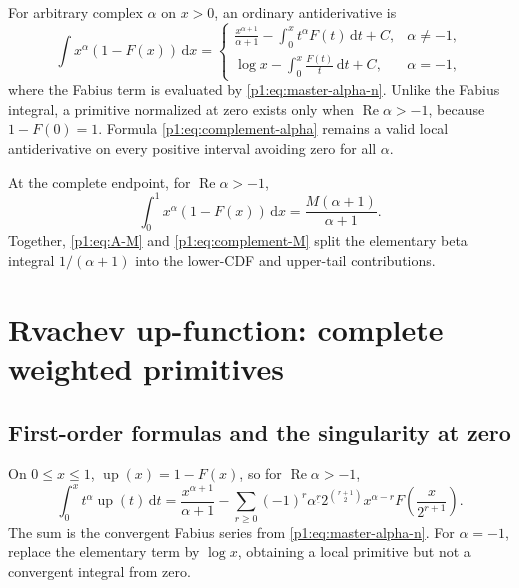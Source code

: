 \documentclass[11pt,oneside]{article}
\theoremstyle{definition}
\theoremstyle{remark}
\newcommand{\Up}{\operatorname{up}}
\newcommand{\dd}{\,\mathrm d}
\newcommand{\fall}[2]{#1^{\underline{#2}}}
\newcommand{\1}{\mathbf 1}
\DeclareMathOperator{\Rea}{Re}
\begin{document}
For arbitrary complex \(\alpha\) on \(x>0\), an ordinary antiderivative is
\begin{equation}
 \int x^\alpha(1-F(x))\dd x=
 \begin{cases}
 \displaystyle \frac{x^{\alpha+1}}{\alpha+1}
 -\int_0^x t^\alpha F(t)\dd t+C,&\alpha\neq-1,\\[3mm]
 \displaystyle \log x-\int_0^x\frac{F(t)}t\dd t+C,&\alpha=-1,
 \end{cases}                                                    \label{p1:eq:complement-alpha}
\end{equation}
where the Fabius term is evaluated by \eqref{p1:eq:master-alpha-n}.  Unlike the
Fabius integral, a primitive normalized at zero exists only when
\(\Rea\alpha>-1\), because \(1-F(0)=1\).  Formula
\eqref{p1:eq:complement-alpha} remains a valid local antiderivative on every
positive interval avoiding zero for all \(\alpha\).

At the complete endpoint, for \(\Rea\alpha>-1\),
\begin{equation}
 \int_0^1x^\alpha(1-F(x))\dd x
 =\frac{M(\alpha+1)}{\alpha+1}.                                \label{p1:eq:complement-M}
\end{equation}
Together, \eqref{p1:eq:A-M} and \eqref{p1:eq:complement-M} split the elementary
beta integral \(1/(\alpha+1)\) into the lower-CDF and upper-tail contributions.

\section{Rvachev up-function: complete weighted primitives}

\subsection{First-order formulas and the singularity at zero}
On \(0\leq x\leq1\), \(\Up(x)=1-F(x)\), so for
\(\Rea\alpha>-1\),
\begin{equation}
 \int_0^xt^\alpha\Up(t)\dd t
 =\frac{x^{\alpha+1}}{\alpha+1}
 -\sum_{r\geq0}(-1)^r\fall\alpha r
 2^{\binom{r+1}{2}}x^{\alpha-r}
 F\!\left(\frac{x}{2^{r+1}}\right).                            \label{p1:eq:up-positive-alpha}
\end{equation}
The sum is the convergent Fabius series from \eqref{p1:eq:master-alpha-n}.
For \(\alpha=-1\), replace the elementary term by \(\log x\), obtaining a
local primitive but not a convergent integral from zero.
\end{document}
